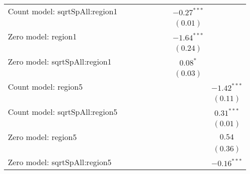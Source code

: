\begin{sidewaystable}
\begin{center}
{\begin{tabular}{l c c c c c c c c}
Count model: sqrtSpAll:region1 &               &               &               &               &                &               & $-0.27^{***}$  &                \\
                               &               &               &               &               &                &               & $(0.01)$       &                \\
Zero model: region1            &               &               &               &               &                &               & $-1.64^{***}$  &                \\
                               &               &               &               &               &                &               & $(0.24)$       &                \\
Zero model: sqrtSpAll:region1  &               &               &               &               &                &               & $0.08^{*}$     &                \\
                               &               &               &               &               &                &               & $(0.03)$       &                \\
Count model: region5           &               &               &               &               &                &               &                & $-1.42^{***}$  \\
                               &               &               &               &               &                &               &                & $(0.11)$       \\
Count model: sqrtSpAll:region5 &               &               &               &               &                &               &                & $0.31^{***}$   \\
                               &               &               &               &               &                &               &                & $(0.01)$       \\
Zero model: region5            &               &               &               &               &                &               &                & $0.54$         \\
                               &               &               &               &               &                &               &                & $(0.36)$       \\
Zero model: sqrtSpAll:region5  &               &               &               &               &                &               &                & $-0.16^{***}$  \\

\end{tabular}}
\end{center}
\end{sidewaystable}
